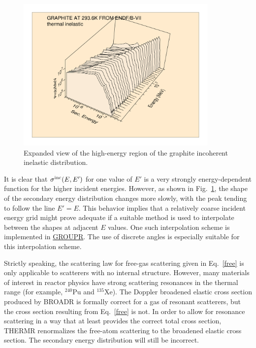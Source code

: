\begin{figure}[thb]\centering
\includegraphics[keepaspectratio, height=3.0in, angle=0]{figs/thermr4ack}
  \caption[Neutron distribution for incoherent inelastic scattering
  from graphite
 (T = 293.6K), expanded view]{Expanded view of the high-energy region
 of the graphite incoherent inelastic distribution.}
\label{dist2}
\end{figure}

It is clear that $\sigma^{\rm inc}(E,E')$ for one value of $E'$ is
a very strongly energy-dependent function for the higher incident
energies.  However, as shown in Fig.~\ref{dist2}, the shape
of the secondary energy distribution changes more slowly,
with the peak tending to follow the line $E'{=}E$.  This behavior
implies that a relatively coarse incident energy grid might prove
adequate if a suitable method is used to interpolate between the
shapes at adjacent $E$ values.  One such interpolation scheme is
implemented in \hyperlink{sGROUPRhy}{GROUPR}.  The
use of discrete angles is
especially suitable for this interpolation scheme.

Strictly speaking, the scattering law for free-gas scattering
given in Eq.~\ref{free} is only applicable to scatterers with no
internal structure.  However, many materials of interest in reactor
physics have strong scattering resonances in the thermal range
(for example, $^{240}$Pu and $^{135}$Xe).  The Doppler broadened elastic
cross section produced by BROADR is formally correct for
a gas of resonant scatterers, but the cross section resulting from
Eq.~\ref{free} is not.  In order to allow for  resonance scattering
in a way that at least provides the correct total cross section, THERMR
renormalizes the free-atom scattering to the broadened elastic cross
section.  The secondary energy distribution will still be incorrect.

